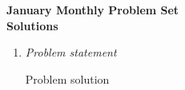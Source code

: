 \documentclass{article}
\begin{document}
\begin{center}
\textbf{\Large January Monthly Problem Set}
\\ \vspace{1em}
\textbf{\large Solutions}
\end{center}

\begin{enumerate}[1.]

\item %
    \textit{Problem statement}

Problem solution

\end{enumerate}
\end{document}

